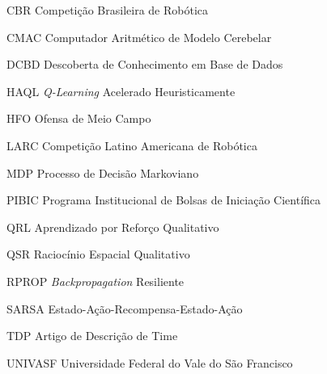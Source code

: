 \begin{KeepFromToc} %
\listoffigures
\cleardoublepage


\listoftables
\cleardoublepage

\makeatletter
\let\l@listing\l@figure
\def\newfloat@listoflisting@hook{\let\figurename\listingname}
\makeatother

\listoflistings

\end{KeepFromToc}

\begin{siglas}
	\item[CBR] Competição Brasileira de Robótica
    \item[CMAC] Computador Aritmético de Modelo Cerebelar
    \item[DCBD] Descoberta de Conhecimento em Base de Dados 
    \item[HAQL] \textit{Q-Learning} Acelerado Heuristicamente
    \item[HFO] Ofensa de Meio Campo
    \item[LARC] Competição Latino Americana de Robótica 
    \item[MDP] Processo de Decisão Markoviano
    \item[PIBIC] Programa Institucional de Bolsas de Iniciação Científica 
    \item[QRL] Aprendizado por Reforço Qualitativo
    \item[QSR] Raciocínio Espacial Qualitativo
    \item[RPROP] \textit{Backpropagation} Resiliente
    \item[SARSA] Estado-Ação-Recompensa-Estado-Ação
    \item[TDP] Artigo de Descrição de Time 
    \item[UNIVASF] Universidade Federal do Vale do São Francisco
	    
\end{siglas}

\tableofcontents*
\cleardoublepage
